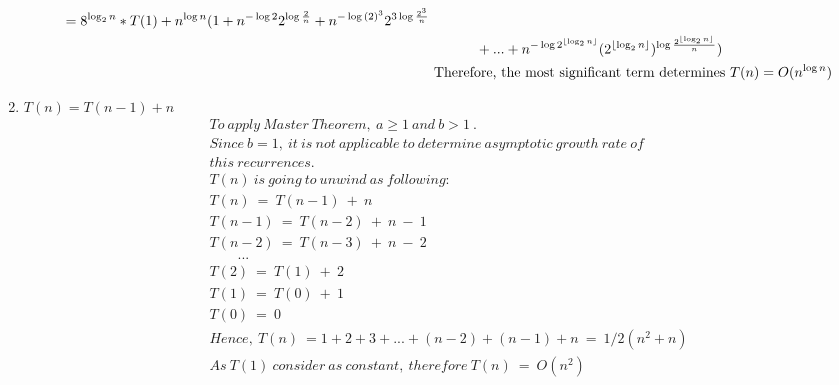 \documentclass[a4paper]{scrartcl}
\begin{document}
\begin{enumerate}[label=(\alph*)]
\begin{align*}
   \qquad=
   8^{\log_2{n}}*T(1)+ n^{\log{n}}(1 
   +n^{-\log{2}}2^{\log{\frac{2}{n}}}+n^{-\log{(2)^3}}2^{3\log{\frac{2^3}{n}}}\\ &\ 
   \quad\qquad+...+
   n^{-\log{2^{\floor{\log_2{n}}}}}(2^{\floor{\log_2{n}}})^{\log{\frac{2^{\floor{\log_2{n}}}}{n}}})\\ &\
   \text{Therefore, the most significant term determines  }T(n)=O(n^{\log{n}})
\end{align*}
\item $T (n) = T (n - 1) + n$
\begin{align*}
  &\ To\ apply\ Master\ Theorem,\ a \geq 1\ and\ b > 1\ .\\ &\
  Since\ b = 1,\ it\ is\ not\ applicable\ to\ determine\ asymptotic\ growth\ rate\ of\\ &\
  this\ recurrences.\\ &\
  T(n)\ is\ going\ to\ unwind\ as\ following:\\ &\
  T(n)\ =\ T(n-1)\ +\ n\\ &\
  T(n-1)\ =\ T(n-2)\ +\ n\ -\ 1\\ &\
  T(n-2)\ =\ T(n-3)\ +\ n\ -\ 2\\ &\
  \qquad ...\\ &\
  T(2)\ =\ T(1)\ +\ 2\\ &\
  T(1)\ =\ T(0)\ +\ 1\\ &\
  T(0)\ =\ 0\\ &\
  Hence,\ T(n)\ = 1+2+3+...+(n-2)+(n-1)+n\ =\ 1/2(n^2+n)\\ &\
  As\ T(1)\ consider\ as\ constant,\ therefore\ T(n)\ =\ O(n^2)
\end{align*}
\end{enumerate}
\end{document}
